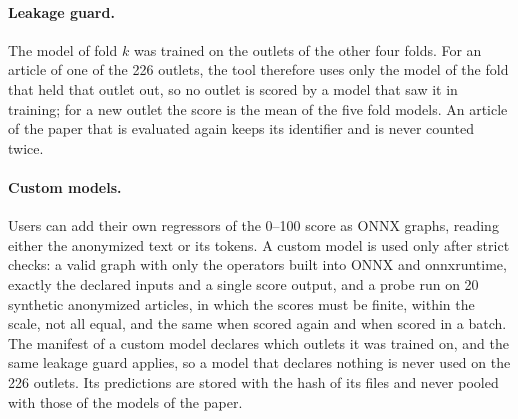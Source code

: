 \documentclass[11pt,a4paper]{article}
\begin{document}
\paragraph{Leakage guard.} The model of fold $k$ was trained on the outlets of the other four folds. For an article of
one of the 226 outlets, the tool therefore uses only the model of the fold that held that outlet out, so no outlet is
scored by a model that saw it in training; for a new outlet the score is the mean of the five fold models. An article of
the paper that is evaluated again keeps its identifier and is never counted twice.

\paragraph{Custom models.} Users can add their own regressors of the 0--100 score as ONNX graphs, reading either the
anonymized text or its tokens. A custom model is used only after strict checks: a valid graph with only the operators
built into ONNX and onnxruntime, exactly the declared inputs and a single score output, and a probe run on 20 synthetic
anonymized articles, in which the scores must be finite, within the scale, not all equal, and the same when scored again
and when scored in a batch. The manifest of a custom model declares which outlets it was trained on, and the same
leakage guard applies, so a model that declares nothing is never used on the 226 outlets. Its predictions are stored
with the hash of its files and never pooled with those of the models of the paper.
\end{document}
